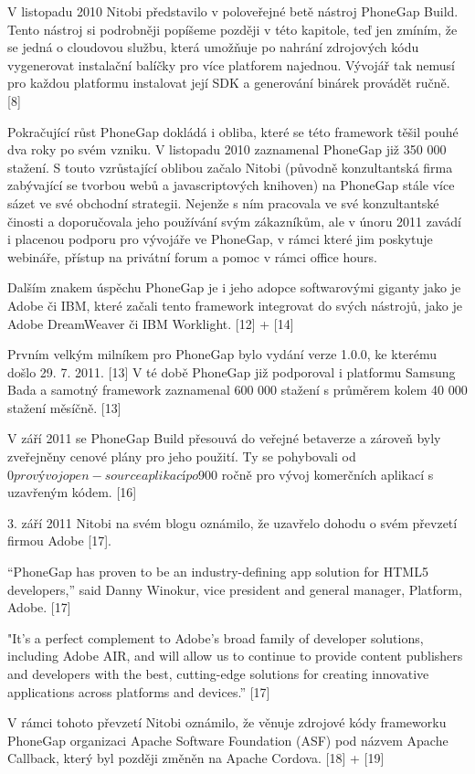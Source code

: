 V listopadu 2010 Nitobi představilo v poloveřejné betě nástroj PhoneGap Build. Tento nástroj si podrobněji popíšeme později v této kapitole, teď jen zmíním, že se jedná o cloudovou službu, která umožňuje po nahrání zdrojových kódu vygenerovat instalační balíčky pro více platforem najednou. Vývojář tak nemusí pro každou platformu instalovat její SDK a generování binárek provádět ručně. [8]

Pokračující růst PhoneGap dokládá i obliba, které se této framework těšil pouhé dva roky po svém vzniku. V listopadu 2010 zaznamenal PhoneGap již 350 000 stažení. S touto vzrůstající oblibou začalo Nitobi (původně konzultantská firma zabývající se tvorbou webů a javascriptových knihoven) na PhoneGap stále více sázet ve své obchodní strategii. Nejenže s ním pracovala ve své konzultantské činosti a doporučovala jeho používání svým zákazníkům, ale v únoru 2011 zavádí i placenou podporu pro vývojáře ve PhoneGap, v rámci které jim poskytuje webináře, přístup na privátní forum a pomoc v rámci office hours.

Dalším znakem úspěchu PhoneGap je i jeho adopce softwarovými giganty jako je Adobe či IBM, které začali tento framework integrovat do svých nástrojů, jako je Adobe DreamWeaver či IBM Worklight. [12] + [14]

Prvním velkým milníkem pro PhoneGap bylo vydání verze 1.0.0, ke kterému došlo 29. 7. 2011. [13] V té době PhoneGap již podporoval i platformu Samsung Bada a samotný framework zaznamenal 600 000 stažení s průměrem kolem 40 000 stažení měsíčně. [13]

V září 2011 se PhoneGap Build přesouvá do veřejné betaverze a zároveň byly zveřejněny cenové plány pro jeho použití. Ty se pohybovali od $0 pro vývoj open-source aplikací po $900 ročně pro vývoj komerčních aplikací s uzavřeným kódem. [16]

3. září 2011 Nitobi na svém blogu oznámilo, že uzavřelo dohodu o svém převzetí firmou Adobe [17].

“PhoneGap has proven to be an industry-defining app solution for HTML5 developers,” said Danny Winokur, vice president and general manager, Platform, Adobe. [17]

"It’s a perfect complement to Adobe’s broad family of developer solutions, including Adobe AIR, and will allow us to continue to provide content publishers and developers with the best, cutting-edge solutions for creating innovative applications across platforms and devices.” [17]

V rámci tohoto převzetí Nitobi oznámilo, že věnuje zdrojové kódy frameworku PhoneGap organizaci Apache Software Foundation (ASF) pod názvem Apache Callback, který byl později změněn na Apache Cordova. [18] + [19]

